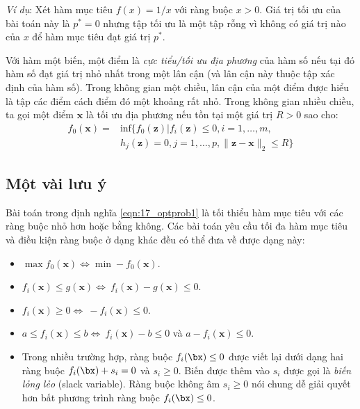 \textit{Ví dụ}: Xét hàm mục tiêu $f(x) = 1/x$ với ràng buộc $x > 0$. Giá trị tối ưu của bài toán này là $p^* = 0$ nhưng tập tối ưu là một tập rỗng
vì không có giá trị nào của $x$ để hàm mục tiêu đạt giá trị $p^*$. 
 
Với hàm một biến, một điểm là \textit{cực tiểu/tối ưu địa phương} của hàm số nếu tại đó hàm số
đạt giá trị nhỏ nhất trong một lân cận (và lân cận này thuộc tập xác định của
hàm số). Trong không gian một chiều, {lân cận} của một điểm được hiểu là
tập các điểm cách điểm đó một khoảng rất nhỏ. Trong không gian nhiều chiều, ta
gọi một điểm $\mathbf{x}$ là {tối ưu địa phương} nếu tồn tại một
giá trị $R > 0$ sao cho:
\begin{eqnarray} 
    \nonumber
    f_0(\mathbf{x}) = &\text{inf}\big\{f_0(\mathbf{z}) | f_i(\mathbf{z}) \leq 0, i = 1, \dots, m, \\
                 & h_j(\mathbf{z}) = 0, j = 1, \dots, p, \|\mathbf{z} - \mathbf{x}\|_2 \leq R\big\} 
\end{eqnarray} 
 
 
\subsection{Một vài lưu ý}
Bài toán trong định nghĩa \eqref{eqn:17_optprob1} là {tối thiểu hàm mục tiêu} với các ràng buộc nhỏ hơn
hoặc bằng không. Các bài toán yêu cầu {tối đa hàm mục tiêu} và điều kiện
ràng buộc ở dạng khác đều có thể đưa về được dạng này:
\begin{itemize}
    \item $\max f_0(\mathbf{x}) \Leftrightarrow\min -f_0(\mathbf{x}) $. 
     
    \item $f_i(\mathbf{x}) \leq g(\mathbf{x}) \Leftrightarrow\ f_i(\mathbf{x}) - g(\mathbf{x}) \leq 0$. 
     
    \item $f_i(\mathbf{x}) \geq 0 \Leftrightarrow\ -f_i(\mathbf{x}) \leq 0 $. 
     
    \item $a \leq f_i(\mathbf{x}) \leq b \Leftrightarrow\ f_i(\mathbf{x}) -b \leq 0$ và $a - f_i(\mathbf{x}) \leq 0$. 
    \item Trong nhiều trường hợp, ràng buộc $f_i(\bx) \leq 0$ được viết lại dưới dạng hai ràng buộc $f_i(\bx) + s_i = 0$ và $s_i \geq 0$. Biến được thêm vào $s_i$ được gọi là \textit{biến lỏng lẻo} (slack variable).   
    Ràng buộc không âm $s_i \geq 0$ nói chung dễ giải quyết hơn bất phương trình ràng buộc $f_i(\bx) \leq 0$.
\end{itemize}
 
